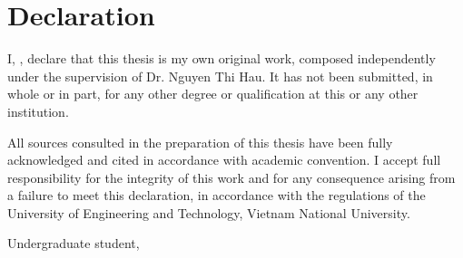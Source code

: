 \chapter*{Declaration}
\thispagestyle{empty}
\makeatletter

\noindent I, \@author, declare that this thesis is my own original work, composed independently under the supervision of Dr. Nguyen Thi Hau. It has not been submitted, in whole or in part, for any other degree or qualification at this or any other institution.

\vspace{1cm}

\noindent All sources consulted in the preparation of this thesis have been fully acknowledged and cited in accordance with academic convention. I accept full responsibility for the integrity of this work and for any consequence arising from a failure to meet this declaration, in accordance with the regulations of the University of Engineering and Technology, Vietnam National University.

\vspace{4cm}
\hfill
\begin{minipage}{0.4\textwidth}
    \centering
    {\fontsize{13pt}{1}\selectfont Undergraduate student,} \\[2cm] 
    {\fontsize{14pt}{1}\selectfont \textbf{\@author}}
\end{minipage}
\vspace*{\fill} 

\newpage